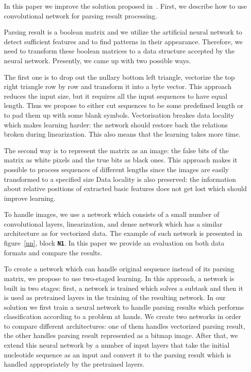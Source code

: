 \documentclass[12pt,a4paper]{cibb}
\begin{document}
In this paper we improve the solution proposed in~\cite{grigorevcomposition}.
First, we describe how to use convolutional network for parsing result processing.

Parsing result is a boolean matrix and we utilize the artificial neural network to detect sufficient features and to find patterns in their appearance.
Therefore, we need to transform these boolean matrices to a data structure accepted by the neural network.
Presently, we came up with two possible ways.

The first one is to drop out the nullary bottom left triangle, vectorize the top right triangle row by row and transform it into a byte vector.
This approach reduces the input size, but it requires all the input sequences to have equal length.
Thus we propose to either cut sequences to be some predefined length or to pad them up with some blank symbols.
Vectorisation breakes data locality which makes learning harder: the network should restore back the relations broken during linearization.
This also means that the learning takes more time.

The second way is to represent the matrix as an image: the false bits of the matrix as white pixels and the true bits as black ones.
This approach makes it possible to process sequences of different lengths since the images are easily transformed to a specified size
Data locality is also preserved: the information about relative positions of extracted basic features does not get lost which should improve learning.

To handle images, we use a network which consists of a small number of convolutional layers, linearization, and dense network which has a similar architecture as for vectorized data.
The example of such network is presented in figure~\ref{nn}, block \textbf{\texttt{N1}}.
In this paper we provide an evaluation on both data formats and compare the results.

To create a network which can handle original sequence instead of its parsing matrix, we propose to use two-staged learning.
In this approach, a network is built in two stages: first, a network is trained which solves a subtask and then it is used as pretrained layers in the training of the resulting network.
In our solution we first train a neural network to handle parsing results which performs classification according to a problem at hands.
We create two networks in order to compare different architectures: one of them handles vectorized parsing result, the other handles parsing result represented as a bitmap image.
After that, we extend this neural network by a number of input layers that take the initial nucleotide sequence as an input and convert it to the parsing result which is handled appropriately by the pretrained layers.
\end{document}
